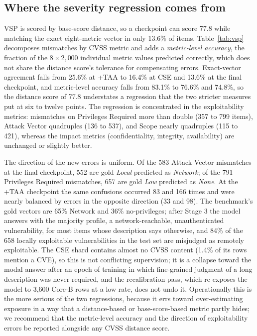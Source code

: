 \documentclass[a4paper,fleqn]{cas-dc}
\begin{document}
\subsection{Where the severity regression comes from}\label{sec:vsp}
VSP is scored by base-score distance, so a checkpoint can score 77.8 while matching the exact eight-metric vector in only 13.6\% of items. Table~\ref{tab:vsp} decomposes mismatches by CVSS metric and adds a \emph{metric-level accuracy}, the fraction of the $8\times2{,}000$ individual metric values predicted correctly, which does not share the distance score's tolerance for compensating errors. Exact-vector agreement falls from 25.6\% at +TAA to 16.4\% at CSE and 13.6\% at the final checkpoint, and metric-level accuracy falls from 83.1\% to 76.6\% and 74.8\%, so the distance score of 77.8 understates a regression that the two stricter measures put at six to twelve points. The regression is concentrated in the exploitability metrics: mismatches on Privileges Required more than double (357 to 799 items), Attack Vector quadruples (136 to 537), and Scope nearly quadruples (115 to 421), whereas the impact metrics (confidentiality, integrity, availability) are unchanged or slightly better.

The direction of the new errors is uniform. Of the 583 Attack Vector mismatches at the final checkpoint, 552 are gold \emph{Local} predicted as \emph{Network}; of the 791 Privileges Required mismatches, 657 are gold \emph{Low} predicted as \emph{None}. At the +TAA checkpoint the same confusions occurred 83 and 166 times and were nearly balanced by errors in the opposite direction (33 and 98). The benchmark's gold vectors are 65\% Network and 36\% no-privileges; after Stage 3 the model answers with the majority profile, a network-reachable, unauthenticated vulnerability, for most items whose description says otherwise, and 84\% of the 658 locally exploitable vulnerabilities in the test set are misjudged as remotely exploitable. The CSE shard contains almost no CVSS content (1.4\% of its rows mention a CVE), so this is not conflicting supervision; it is a collapse toward the modal answer after an epoch of training in which fine-grained judgment of a long description was never required, and the recalibration pass, which re-exposes the model to 3,600 Core-B rows at a low rate, does not undo it. Operationally this is the more serious of the two regressions, because it errs toward over-estimating exposure in a way that a distance-based or base-score-based metric partly hides; we recommend that the metric-level accuracy and the direction of exploitability errors be reported alongside any CVSS distance score.
\end{document}

